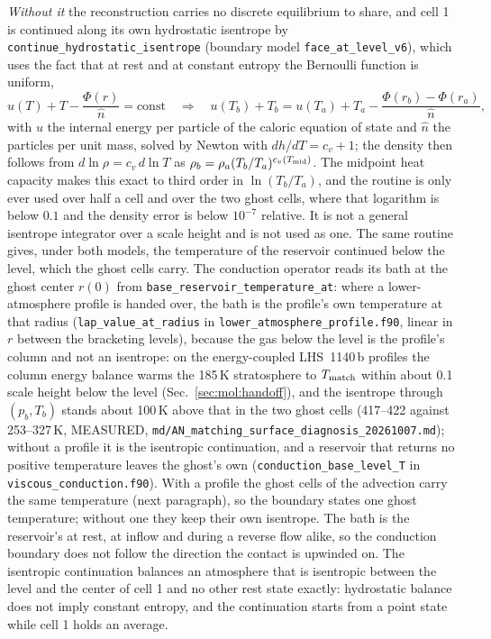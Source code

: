 \emph{Without it} the reconstruction carries no discrete equilibrium to
share, and cell 1 is continued along its own hydrostatic isentrope by
\texttt{continue\_hydrostatic\_isentrope} (boundary model
\texttt{face\_at\_level\_v6}), which uses the fact that at rest and at
constant entropy the Bernoulli function is uniform,
%
\begin{equation}
  u(T) + T - \frac{\Phi(r)}{\hat n} = \text{const}
  \quad\Longrightarrow\quad
  u(T_b) + T_b = u(T_a) + T_a - \frac{\Phi(r_b) - \Phi(r_a)}{\hat n},
  \label{eq:isentrope_T}
\end{equation}
%
with $u$ the internal energy per particle of the caloric equation of state and
$\hat n$ the particles per unit mass, solved by Newton with
$dh/dT = c_v + 1$; the density then follows from $d\ln\rho = c_v\,d\ln T$ as
$\rho_b = \rho_a (T_b/T_a)^{c_v(T_{\rm mid})}$.  The midpoint heat capacity
makes this exact to third order in $\ln(T_b/T_a)$, and the routine is only
ever used over half a cell and over the two ghost cells, where that logarithm
is below $0.1$ and the density error is below $10^{-7}$ relative.  It is not
a general isentrope integrator over a scale height and is not used as one.
The same routine gives, under both models, the temperature of the reservoir
continued below the level, which the ghost cells carry.  The conduction
operator reads its bath at the ghost center $r(0)$ from
\texttt{base\_reservoir\_temperature\_at}: where a lower-atmosphere profile
is handed over, the bath is the profile's own temperature at that radius
(\texttt{lap\_value\_at\_radius} in \texttt{lower\_atmosphere\_profile.f90},
linear in $r$ between the bracketing levels), because the gas below the level
is the profile's column and not an isentrope: on the energy-coupled
LHS~1140\,b profiles the column energy balance warms the 185\,K stratosphere
to $T_{\rm match}$ within about 0.1 scale height below the level
(Sec.~\ref{sec:mol:handoff}), and the isentrope through $(p_b,T_b)$ stands
about 100\,K above that in the two ghost cells (417--422 against
253--327\,K, MEASURED, \texttt{md/AN\_matching\_surface\_diagnosis\_20261007.md});
without a profile it is the
isentropic continuation, and a reservoir that returns no positive
temperature leaves the ghost's own (\texttt{conduction\_base\_level\_T} in
\texttt{viscous\_conduction.f90}).  With a profile the ghost cells of the
advection carry the same temperature (next paragraph), so the boundary states
one ghost temperature; without one they keep their own isentrope.  The bath is the reservoir's at rest, at
inflow and during a reverse flow alike, so the conduction boundary does not
follow the direction the contact is upwinded on.  The isentropic continuation
balances an atmosphere that is isentropic between the level and the center of
cell 1 and no other rest state exactly: hydrostatic balance does not imply
constant entropy, and the continuation starts from a point state while cell 1
holds an average.

